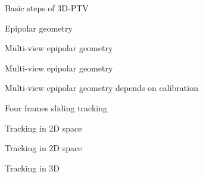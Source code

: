 \begin{frame}[label=ptv-2]{Basic steps of 3D-PTV}
\centering{}
\end{frame}


\begin{frame}[label=ptv-5]{Epipolar geometry}
\centering{}
\end{frame}

\begin{frame}[label=ptv-51]{Multi-view epipolar geometry}
\centering{}
\end{frame}

\begin{frame}[label=ptv-51]{Multi-view epipolar geometry}
\centering{}
\end{frame}

\begin{frame}[label=ptv-55]{Multi-view epipolar geometry depends on calibration}
\centering{}
\end{frame}

	

\begin{frame}[label=ptv-6]{Four frames sliding tracking}
\centering{}
\end{frame}

\begin{frame}[label=ptv-61]{Tracking in 2D space}
\centering{}
\end{frame}


\begin{frame}[label=ptv-61]{Tracking in 2D space}
	\centering{}
\end{frame}

\begin{frame}[label=ptv-61]{Tracking in 3D }
	\centering{}
\end{frame}

